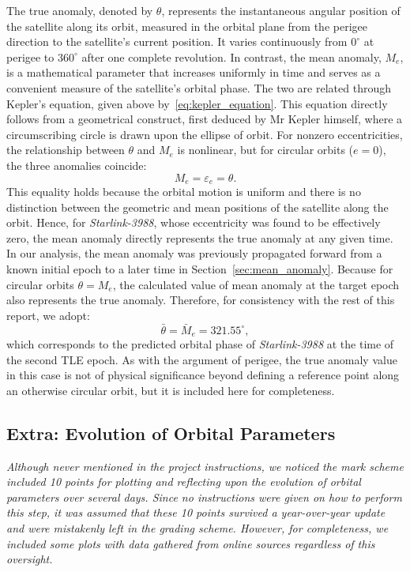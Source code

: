 \documentclass{article}
\begin{document}
The true anomaly, denoted by $\theta$, represents the instantaneous angular position of the satellite along its orbit, measured in the orbital plane from the perigee direction to the satellite’s current position. It varies continuously from $0^{\circ}$ at perigee to $360^{\circ}$ after one complete revolution. In contrast, the mean anomaly, $M_e$, is a mathematical parameter that increases uniformly in time and serves as a convenient measure of the satellite’s orbital phase. The two are related through Kepler’s equation, given above by~\eqref{eq:kepler_equation}. This equation directly follows from a geometrical construct, first deduced by Mr Kepler himself, where a circumscribing circle is drawn upon the ellipse of orbit. For nonzero eccentricities, the relationship between $\theta$ and $M_e$ is nonlinear, but for circular orbits ($e = 0$), the three anomalies coincide:
\[
\,M_e = \varepsilon_e = \theta.\,
\]
This equality holds because the orbital motion is uniform and there is no distinction between the geometric and mean positions of the satellite along the orbit. Hence, for \textit{Starlink-3988}, whose eccentricity was found to be effectively zero, the mean anomaly directly represents the true anomaly at any given time. In our analysis, the mean anomaly was previously propagated forward from a known initial epoch to a later time in Section~\ref{sec:mean_anomaly}. Because for circular orbits $\theta = M_e$, the calculated value of mean anomaly at the target epoch also represents the true anomaly. Therefore, for consistency with the rest of this report, we adopt:
\[
\boxed{\,\bar{\theta} = \bar{M}_{e} = 321.55^{\circ},\,}
\]
which corresponds to the predicted orbital phase of \textit{Starlink-3988} at the time of the second TLE epoch.  
As with the argument of perigee, the true anomaly value in this case is not of physical significance beyond defining a reference point along an otherwise circular orbit, but it is included here for completeness.

\subsection{Extra: Evolution of Orbital Parameters} \label{sec:evolution_of_parameters}
\begin{center}
    \textit{Although never mentioned in the project instructions, we noticed the mark scheme included 10 points for plotting and reflecting upon the evolution of orbital parameters over several days. Since no instructions were given on how to perform this step, it was assumed that these 10 points survived a year-over-year update and were mistakenly left in the grading scheme. However, for completeness, we included some plots with data gathered from online sources regardless of this oversight.}
\end{center}
\end{document}
